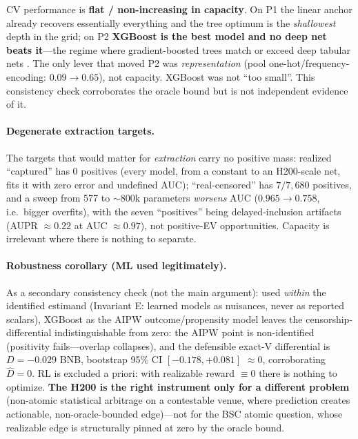 \documentclass[11pt]{article}
\begin{document}
\noindent CV performance is \textbf{flat / non-increasing in capacity}. On P1 the linear
anchor already recovers essentially everything and the tree optimum is the
\emph{shallowest} depth in the grid; on P2 \textbf{XGBoost is the best model and no deep
net beats it}---the regime where gradient-boosted trees match or exceed deep tabular nets
\cite{grinsztajn2022tabular}. The only lever that moved P2 was \emph{representation} (pool
one-hot/frequency-encoding: $0.09 \to 0.65$), not capacity. XGBoost was not ``too small''.
This consistency check corroborates the oracle bound but is not independent evidence of it.

\paragraph{Degenerate extraction targets.} The targets that would matter for
\emph{extraction} carry no positive mass: realized ``captured'' has 0 positives (every
model, from a constant to an H200-scale net, fits it with zero error and undefined AUC);
``real-censored'' has $7/7{,}680$ positives, and a sweep from 577 to $\sim$800k parameters
\emph{worsens} AUC ($0.965 \to 0.758$, i.e.\ bigger overfits), with the seven
``positives'' being delayed-inclusion artifacts (AUPR $\approx 0.22$ at AUC $\approx
0.97$), not positive-EV opportunities. Capacity is irrelevant where there is nothing to
separate.

\paragraph{Robustness corollary (ML used legitimately).} As a secondary consistency check
(not the main argument): used \emph{within} the identified
estimand (Invariant E: learned models as nuisances, never as reported scalars), XGBoost as
the AIPW outcome/propensity model leaves the censorship-differential indistinguishable
from zero: the AIPW point is non-identified (positivity fails---overlap collapses), and the
defensible exact-V differential is $D = -0.029$ BNB, bootstrap 95\% CI $[-0.178, +0.081]$
$\approx 0$, corroborating $\hat D = 0$. RL is excluded a priori: with realizable reward
$\equiv 0$ there is nothing to optimize. \textbf{The H200 is the right instrument only for
a different problem} (non-atomic statistical arbitrage on a contestable venue, where
prediction creates actionable, non-oracle-bounded edge)---not for the BSC atomic question,
whose realizable edge is structurally pinned at zero by the oracle bound.
\end{document}
